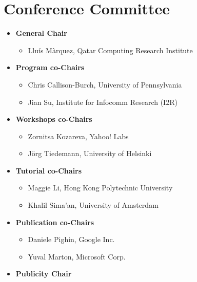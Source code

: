 \section{Conference Committee}
\begin{itemize}[itemsep=7pt, leftmargin=0cm, label={}]
\item \textbf{General Chair}

\begin{itemize}[nosep, leftmargin=0.5cm, label={}]
\item Lluís Màrquez, Qatar Computing Research Institute
\end{itemize}
\item \textbf{Program co-Chairs}

\begin{itemize}[nosep, leftmargin=0.5cm, label={}]
\item Chris Callison-Burch, University of Pennsylvania 
\item Jian Su, Institute for Infocomm Research (I2R) 
\end{itemize}
\item \textbf{Workshops co-Chairs}

\begin{itemize}[nosep, leftmargin=0.5cm, label={}]
\item Zornitsa Kozareva, Yahoo! Labs
\item Jörg Tiedemann, University of Helsinki
\end{itemize}
\item \textbf{Tutorial co-Chairs}

\begin{itemize}[nosep, leftmargin=0.5cm, label={}]
\item Maggie Li, Hong Kong Polytechnic University 
\item Khalil Sima'an, University of Amsterdam 
\end{itemize}
\item \textbf{Publication co-Chairs} 

\begin{itemize}[nosep, leftmargin=0.5cm, label={}]
\item Daniele Pighin, Google Inc.  
\item Yuval Marton, Microsoft Corp. 
\end{itemize}
\item \textbf{Publicity Chair} 


\end{itemize}
